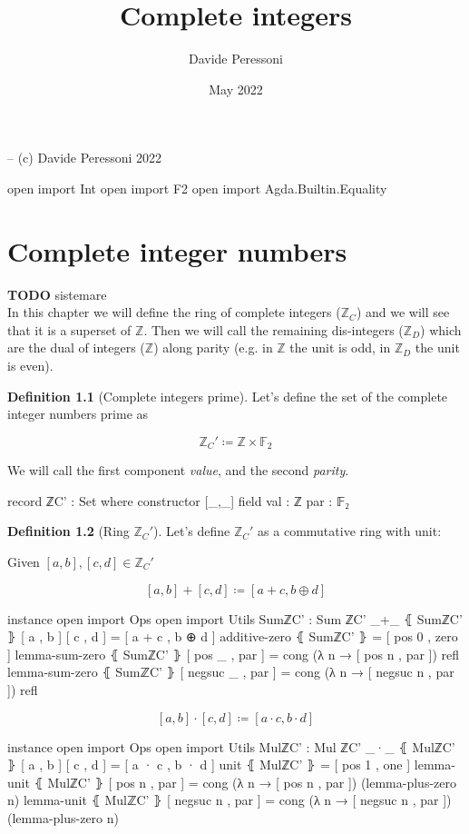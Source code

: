 \documentclass[a4paper]{report}
\title{Complete integers}
\author{Davide Peressoni}
\date{May 2022}
\theoremstyle{definition}
\newtheorem{definition}{Definition}
\newcommand\bZ{\mathbb{Z}}
\newcommand\bF{\mathbb{F}}
\begin{document}
\maketitle

\begin{code}
-- (c) Davide Peressoni 2022

open import Int
open import F2
open import Agda.Builtin.Equality
\end{code}

\chapter{Complete integer numbers}

\textbf{TODO} sistemare\\
In this chapter we will define the ring of complete integers ($\bZ_C$) and we will
see that it is a superset of $\bZ$. Then we will call the remaining dis-integers
($\bZ_D$) which are the dual of integers ($\bZ$) along parity (e.g. in $\bZ$ the unit is
odd, in $\bZ_D$ the unit is even).

\begin{definition}[Complete integers prime]
Let's define the set of the complete integer numbers prime as

\[\bZ_C' \coloneqq \bZ\times\bF_2\]

We will call the first component \emph{value}, and the second \emph{parity}.

\begin{code}
record ℤC' : Set where
  constructor [_,_]
  field
    val : ℤ
    par : 𝔽₂
\end{code}
\end{definition}

\begin{definition}[Ring $\bZ_C'$]
Let's define $\bZ_C'$ as a commutative ring with unit:

Given $[a,b], [c,d] \in \bZ_C'$

\[[a,b] + [c,d] \coloneqq [a+c, b\oplus d]\]

\begin{code}
instance
  open import Ops
  open import Utils
  SumℤC' : Sum ℤC'
  _+_ ⦃ SumℤC' ⦄ [ a , b ] [ c , d ] = [ a + c , b ⊕ d ]
  additive-zero ⦃ SumℤC' ⦄ = [ pos 0 , zero ]
  lemma-sum-zero ⦃ SumℤC' ⦄ [ pos _    , par ] = cong (λ n → [ pos n , par ]) refl
  lemma-sum-zero ⦃ SumℤC' ⦄ [ negsuc _ , par ] = cong (λ n → [ negsuc n , par ]) refl
\end{code}

\[[a,b] \cdot [c,d] \coloneqq [a\cdot c, b\cdot d]\]

\begin{code}
instance
  open import Ops
  open import Utils
  MulℤC' : Mul ℤC'
  _·_ ⦃ MulℤC' ⦄ [ a , b ] [ c , d ] = [ a · c , b · d ]
  unit ⦃ MulℤC' ⦄ = [ pos 1 , one ]
  lemma-unit ⦃ MulℤC' ⦄ [ pos n    , par ] = cong (λ n → [ pos n , par ]) (lemma-plus-zero n)
  lemma-unit ⦃ MulℤC' ⦄ [ negsuc n , par ] = cong (λ n → [ negsuc n , par ]) (lemma-plus-zero n)
\end{code}
\end{definition}
\end{document}
